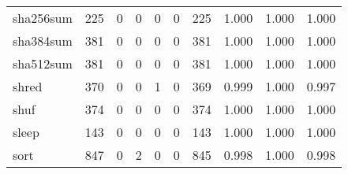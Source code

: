 \begin{longtable}{lp{1.3cm}p{1.3cm}p{1.3cm}p{1.3cm}p{1.3cm}p{1.3cm}p{1.3cm}p{1.3cm}p{1.3cm}}
sha256sum &                    225 &                                  0 &                                 0 &                                0 &                                 0 &                             225 &                                   1.000 &                                  1.000 &                                1.000 \\
sha384sum &                    381 &                                  0 &                                 0 &                                0 &                                 0 &                             381 &                                   1.000 &                                  1.000 &                                1.000 \\
sha512sum &                    381 &                                  0 &                                 0 &                                0 &                                 0 &                             381 &                                   1.000 &                                  1.000 &                                1.000 \\
shred     &                    370 &                                  0 &                                 0 &                                1 &                                 0 &                             369 &                                   0.999 &                                  1.000 &                                0.997 \\
shuf      &                    374 &                                  0 &                                 0 &                                0 &                                 0 &                             374 &                                   1.000 &                                  1.000 &                                1.000 \\
sleep     &                    143 &                                  0 &                                 0 &                                0 &                                 0 &                             143 &                                   1.000 &                                  1.000 &                                1.000 \\
sort      &                    847 &                                  0 &                                 2 &                                0 &                                 0 &                             845 &                                   0.998 &                                  1.000 &                                0.998 \\

\end{longtable}
